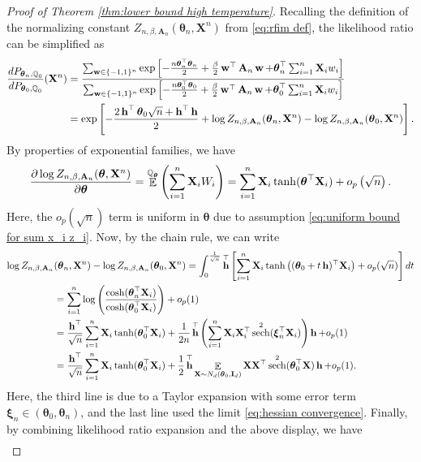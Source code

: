 \documentclass[preprint,reqno]{imsart}
\newcommand{\ttheta}{\boldsymbol{\theta}}
\newcommand{\I}{\mathbf{I}_{\mathnormal{d}}}
\DeclareMathOperator{\bw}{\textbf{w}}
\DeclareMathOperator{\bh}{\textbf{h}}
\DeclareMathOperator{\sech}{sech}
\DeclareMathOperator{\EE}{\mathbb{E}}
\DeclareMathOperator{\QQ}{\mathbb{Q}}
\newcommand{\A}{\mathbf{A}}
\newcommand{\X}{\mathbf{X}}
\newcommand{\xxi}{\boldsymbol \xi}
\DeclareMathOperator{\sumin}{\sum_{\mathnormal i=1}^{\mathnormal n}}
\begin{document}
\begin{proof}[Proof of Theorem \ref{thm:lower bound high temperature}]
Recalling the definition of the normalizing constant $Z_{n, \beta, \A_n}(\ttheta_n, \X^n)$ from \eqref{eq:rfim def}, the likelihood ratio can be simplified as
\begin{align*}
    \frac{dP_{\ttheta_n,\QQ_{0}}}{dP_{\ttheta_0, \QQ_{0}}} (\X^n) &= \frac{\sum_{\bw \in \{-1,1\}^n} \exp \left[ - \frac{n\ttheta_n^\top \ttheta_n}{2} + \frac{\beta}{2} \bw^\top \A_n \bw + \ttheta_n^\top \sumin \X_i w_i \right]}{\sum_{\bw \in \{-1,1\}^n} \exp \left[ - \frac{n\ttheta_0^\top \ttheta_0}{2} + \frac{\beta}{2}\bw^\top \A_n \bw + \ttheta_0^\top \sumin \X_i w_i \right]} \\
    &= \exp \left[ {-\frac{2 \bh^\top \ttheta_0 \sqrt{n} + \bh^\top \bh}{2}} + \log Z_{n, \beta, \A_n}(\ttheta_n, \X^n) - \log Z_{n, \beta, \A_n}(\ttheta_0, \X^n) \right].
\end{align*}
By properties of exponential families, we have
$$\frac{\partial \log Z_{n, \beta, \A_n}(\ttheta, \X^n)}{\partial \ttheta} = \EE^{\QQ_{\ttheta}} \left(\sumin \X_i W_i \right) = \sumin \X_i \tanh(\ttheta^\top \X_i) + o_p\left({\sqrt{n}}\right).$$
Here, the $o_p\left({\sqrt{n}}\right)$ term is uniform in $\ttheta$ due to assumption \eqref{eq:uniform bound for sum x_i z_i}.
%
Now, by the chain rule, we can write
\begin{align*}
    \log Z_{n, \beta, \A_n} &(\ttheta_n, \X^n) - \log Z_{n, \beta, \A_n}(\ttheta_0, \X^n) = \int_{0}^{\frac{1}{\sqrt{n}}} \bh^\top \left[\sumin \X_i \tanh\left((\ttheta_0 + t \bh)^\top \X_i\right) + o_p(\sqrt{n}) \right] dt      \\
    &= \sumin \log \left( \frac{\cosh(\ttheta_n^\top \X_i)}{\cosh(\ttheta_0^\top \X_i)} \right) + o_p(1) \\
    &= \frac{\bh^\top}{\sqrt{n}} \sumin \X_i \tanh(\ttheta_0^\top \X_i) + \frac{1}{2n} \bh^\top \left(\sumin \X_i \X_i^\top \sech^2(\xxi_n^\top \X_i) \right) \bh + o_p(1) \\
    &= \frac{\bh^\top}{\sqrt{n}} \sumin \X_i \tanh(\ttheta_0^\top \X_i) + \frac{1}{2} \bh^\top \EE_{\X \sim N_d(\ttheta_0, \I)} \X \X^\top \sech^2(\ttheta_0^\top \X) \bh + o_p(1).
\end{align*}
%
Here, the third line is due to a Taylor expansion with some error term $\xxi_n \in (\ttheta_0,\ttheta_n)$, and the last line used the limit \eqref{eq:hessian convergence}.
%
Finally, by combining likelihood ratio expansion and the above display, we have
\begin{align*}

\end{align*}
\end{proof}
\end{document}
